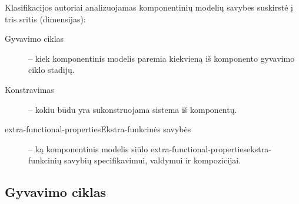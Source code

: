 Klasifikacijos autoriai analizuojamas komponentinių modelių savybes
suskirstė į tris sritis (dimensijas):
\begin{description}
  \item[Gyvavimo ciklas] – kiek komponentinis modelis paremia kiekvieną
    iš komponento gyvavimo ciklo stadijų.
  \item[Konstravimas] – kokiu būdu yra sukonstruojama sistema iš
    komponentų.
  \item[\gls{extra-functional-properties}{Ekstra-funkcinės savybės}]
    – ką komponentinis modelis siūlo
    \gls{extra-functional-properties}{ekstra-funkcinių savybių}
    specifikavimui, valdymui ir kompozicijai.
\end{description}

\subsection{Gyvavimo ciklas}

